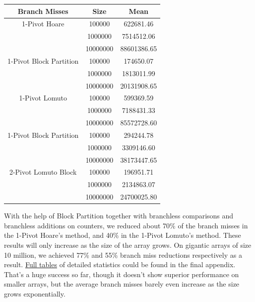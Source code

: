 \documentclass{article}
\begin{document}
\begin{center}
\small
\begin{tabular}{ |c c | c | }
    \hline
    Branch Misses   & Size     & Mean         \\
    \hline
    1-Pivot Hoare   & 100000   & 622681.46    \\
                    & 1000000  & 7514512.06   \\
                    & 10000000 & 88601386.65  \\
    \hline
1-Pivot Block Partition & 100000   & 174650.07    \\
                    & 1000000  & 1813011.99   \\
                    & 10000000 & 20131908.65  \\
    \hline
    1-Pivot Lomuto  & 100000   & 599369.59    \\
                    & 1000000  & 7188431.33   \\
                    & 10000000 & 85572728.60  \\
    \hline
1-Pivot Block Partition & 100000   & 294244.78    \\
                    & 1000000  & 3309146.60   \\
                    & 10000000 & 38173447.65  \\
    \hline
2-Pivot Lomuto Block& 100000   & 196951.71    \\
                    & 1000000  & 2134863.07   \\
                    & 10000000 & 24700025.80  \\
    \hline
\end{tabular}
\end{center}

With the help of Block Partition together with branchless comparisons and branchless additions on counters, we reduced about 70\% of the branch misses in the 1-Pivot Hoare's method, and 40\% in the 1-Pivot Lomuto's method. These results will only increase as the size of the array grows.
On gigantic arrays of size 10 million, we achieved 77\% and 55\% branch miss reductions respectively as a result. \hyperlink{FullTables}{Full tables} of detailed statistics could be found in the final appendix. That's a huge success so far, though it doesn't show superior performance on smaller arrays, but the average branch misses barely even increase as the size grows exponentially.
\end{document}
